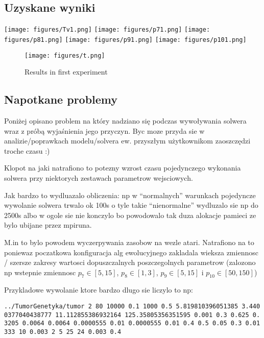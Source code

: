 \documentclass[]{article}
\begin{document}
\subsection{Uzyskane wyniki}\label{uzyskane-wyniki}

\texttt{[image: figures/Tv1.png]}
\texttt{[image: figures/p71.png]}
\texttt{[image: figures/p81.png]}
\texttt{[image: figures/p91.png]}
\texttt{[image: figures/p101.png]}

\begin{figure}[htbp]
\centering
\texttt{[image: figures/t.png]}
\caption{Results in first experiment\label{fig:first}}
\end{figure}

\subsection{Napotkane problemy}\label{napotkane-problemy}

Poniżej opisano problem na który nadziano się podczas wywoływania
solwera wraz z próbą wyjaśnienia jego przyczyn. Byc moze przyda sie w
analizie/poprawkach modelu/solvera ew. przyszłym użytkownikom
zaoszczędzi troche czasu :)

Klopot na jaki natrafiono to potezny wzrost czasu pojedynczego wykonania
solwera przy niektorych zestawach parametrow wejsciowych.

Jak bardzo to wydluazalo obliczenia: np w ``normalnych'' warunkach
pojedyncze wywolanie solwera trwalo ok 100s o tyle takie ``nienormalne''
wydluzalo sie np do 2500s albo w ogole sie nie konczylo bo powodowalo
tak duza alokacje pamieci ze bylo ubijane przez mpiruna.

M.in to bylo powodem wyczerpywania zasobow na wezle atari. Natrafiono na
to poniewaz poczatkowa konfiguracja alg ewolucyjnego zakladala wieksza
zmiennosc / szersze zakresy wartosci dopuszczalnych poszczegolnych
parametrow (zalozono np wstepnie zmiennosc \(p_7 \in [5,15]\),
\(p_8 \in [1,3]\), \(p_9 \in [5,15]\) i \(p_{10} \in [50,150]\))

Przykladowe wywolanie ktore bardzo dlugo sie liczylo to np:

\texttt{../TumorGenetyka/tumor\ 2\ 80\ 10000\ 0.1\ 1000\ 0.5\ 5.819810396051385\ 3.4400377040438777\ 11.112855386932164\ 125.35805356351595\ 0.001\ 0.3\ 0.625\ 0.3205\ 0.0064\ 0.0064\ 0.0000555\ 0.01\ 0.0000555\ 0.01\ 0.4\ 0.5\ 0.05\ 0.3\ 0.01333\ 10\ 0.003\ 2\ 5\ 25\ 24\ 0.003\ 0.4}
\end{document}

